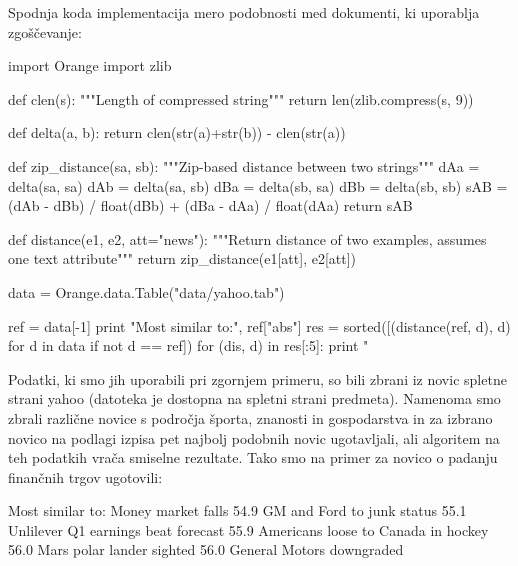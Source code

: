 Spodnja koda implementacija mero podobnosti med dokumenti, ki
uporablja zgoščevanje:

\begin{python}
import Orange
import zlib

def clen(s):
    """Length of compressed string"""
    return len(zlib.compress(s, 9))

def delta(a, b):
    return clen(str(a)+str(b)) - clen(str(a))

def zip_distance(sa, sb):
    """Zip-based distance between two strings"""
    dAa = delta(sa, sa)
    dAb = delta(sa, sb)
    dBa = delta(sb, sa)
    dBb = delta(sb, sb)
    sAB = (dAb - dBb) / float(dBb) + (dBa - dAa) / float(dAa)
    return sAB

def distance(e1, e2, att="news"):
    """Return distance of two examples, assumes one text attribute"""
    return zip_distance(e1[att], e2[att])

data = Orange.data.Table("data/yahoo.tab")

ref = data[-1]
print "Most similar to:", ref["abs"]
res = sorted([(distance(ref, d), d) for d in data if not d == ref])
for (dis, d) in res[:5]:
    print "%
\end{python}

Podatki, ki smo jih uporabili pri zgornjem primeru, so bili zbrani iz
novic spletne strani yahoo (datoteka je dostopna na spletni strani
predmeta). Namenoma smo zbrali različne novice s področja športa,
znanosti in gospodarstva in za izbrano novico na podlagi izpisa pet
najbolj podobnih novic ugotavljali, ali algoritem na teh podatkih
vrača smiselne rezultate. Tako smo na primer za novico o padanju
finančnih trgov ugotovili:

\begin{python}
Most similar to: Money market falls
54.9 GM and Ford to junk status
55.1 Unlilever Q1 earnings beat forecast
55.9 Americans loose to Canada in hockey
56.0 Mars polar lander sighted
56.0 General Motors downgraded
\end{python}
\fi
